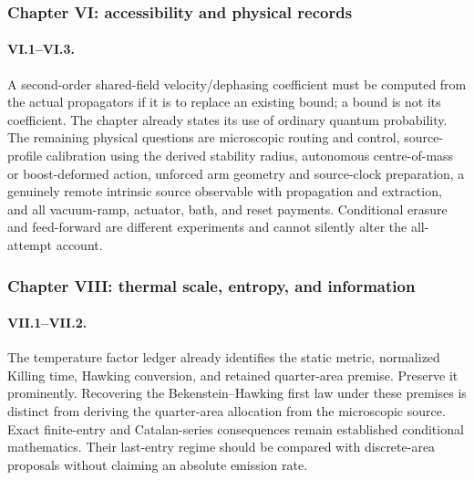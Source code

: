 \subsubsection*{Chapter VI: accessibility and physical records}

\paragraph{VI.1--VI.3.}
A second-order shared-field velocity/dephasing coefficient must be computed from the actual propagators if it is to replace an existing bound; a bound is not its coefficient. The chapter already states its use of ordinary quantum probability. The remaining physical questions are microscopic routing and control, source-profile calibration using the derived stability radius, autonomous centre-of-mass or boost-deformed action, unforced arm geometry and source-clock preparation, a genuinely remote intrinsic source observable with propagation and extraction, and all vacuum-ramp, actuator, bath, and reset payments. Conditional erasure and feed-forward are different experiments and cannot silently alter the all-attempt account.

\subsubsection*{Chapter VIII: thermal scale, entropy, and information}

\paragraph{VII.1--VII.2.}
The temperature factor ledger already identifies the static metric, normalized Killing time, Hawking conversion, and retained quarter-area premise. Preserve it prominently. Recovering the Bekenstein--Hawking first law under these premises is distinct from deriving the quarter-area allocation from the microscopic source. Exact finite-entry and Catalan-series consequences remain established conditional mathematics. Their last-entry regime should be compared with discrete-area proposals without claiming an absolute emission rate.

